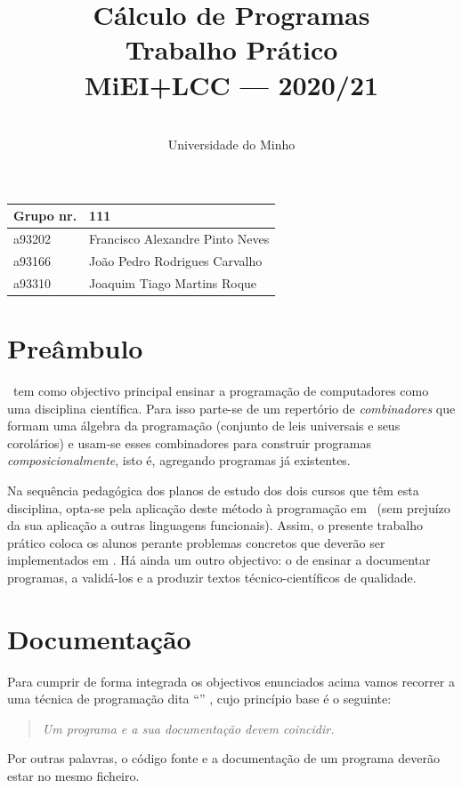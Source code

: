 \documentclass[a4paper]{article}
\title{
       	Cálculo de Programas
\\
       	Trabalho Prático
\\
       	MiEI+LCC --- 2020/21
}
\author{
       	\dium
\\
       	Universidade do Minho
}
\date\mydate
\begin{document}
\maketitle

\begin{center}\large
\begin{tabular}{ll}
\textbf{Grupo} nr. & 111
\\\hline
a93202 & Francisco Alexandre Pinto Neves
\\
a93166 & João Pedro Rodrigues Carvalho
\\
a93310 & Joaquim Tiago Martins Roque
\end{tabular}
\end{center}

\section{Preâmbulo}

\CP\ tem como objectivo principal ensinar
a progra\-mação de computadores como uma disciplina científica. Para isso
parte-se de um repertório de \emph{combinadores} que formam uma álgebra da
programação (conjunto de leis universais e seus corolários) e usam-se esses
combinadores para construir programas \emph{composicionalmente}, isto é,
agregando programas já existentes.

Na sequência pedagógica dos planos de estudo dos dois cursos que têm
esta disciplina, opta-se pela aplicação deste método à programação
em \Haskell\ (sem prejuízo da sua aplicação a outras linguagens
funcionais). Assim, o presente trabalho prático coloca os
alunos perante problemas concretos que deverão ser implementados em
\Haskell.  Há ainda um outro objectivo: o de ensinar a documentar
programas, a validá-los e a produzir textos técnico-científicos de
qualidade.

\section{Documentação} Para cumprir de forma integrada os objectivos
enunciados acima vamos recorrer a uma técnica de programa\-ção dita
``'' \cite{Kn92}, cujo princípio base é o seguinte:
%
\begin{quote}\em Um programa e a sua documentação devem coincidir.
\end{quote}
%
Por outras palavras, o código fonte e a documentação de um
programa deverão estar no mesmo ficheiro.
\end{document}
